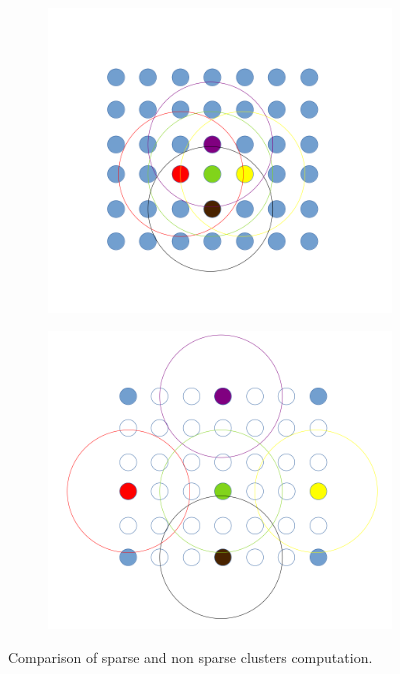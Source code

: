 \begin{figure}[H]
	\begin{center}
		\begin{subfigure}[b]{0.48\textwidth}
			\includegraphics[width=\textwidth]{figures/FullDomainClusters.png}
			\caption{} \label{fig:mls_clusters_sparse_generations_nonsparse}
		\end{subfigure}
		\begin{subfigure}[b]{0.48\textwidth}
			\includegraphics[width=\textwidth]{figures/PartialDomainClusters.png}
			\caption{} \label{fig:mls_clusters_sparse_generations_sparse}
		\end{subfigure}
	\end{center}
	\caption{Comparison of sparse and non sparse clusters computation.} \label{fig:mls_clusters_sparse_generations}
\end{figure} 
